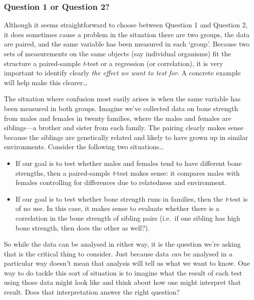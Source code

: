\documentclass[
]{book}
\newenvironment{greybox}{
  \definecolor{shadecolor}{rgb}{0.95,0.95,0.95}  %
  \color{black}
  \begin{shaded}}
 {\end{shaded}}
\newenvironment{infobox}[1]
  {
  \begin{itemize}
  \renewcommand{\labelitemi}{
    \raisebox{-.7\height}[0pt][0pt]{
      {\setkeys{Gin}{width=3em,keepaspectratio}
        \texttt{[image: images/\#1]}}
    }
  }
  \setlength{\fboxsep}{1em}
  \begin{greybox}
  \item
  }
  {
  \end{greybox}
  \end{itemize}
  }
\begin{document}
\begin{infobox}{warning}

\hypertarget{question-1-or-question-2}{%
\subsubsection*{Question 1 or Question 2?}\label{question-1-or-question-2}}

Although it seems straightforward to choose between Question 1 and Question 2, it does sometimes cause a problem in the situation there are two groups, the data are paired, and the same variable has been measured in each `group'. Because two sets of measurements on the same objects (say individual organisms) fit the structure a paired-sample \emph{t}-test or a regression (or correlation), it is very important to identify clearly \emph{the effect we want to test for}. A concrete example will help make this clearer\ldots{}

The situation where confusion most easily arises is when the same variable has been measured in both groups. Imagine we've collected data on bone strength from males and females in twenty families, where the males and females are siblings---a brother and sister from each family. The pairing clearly makes sense because the siblings are genetically related and likely to have grown up in similar environments. Consider the following two situations\ldots{}

\begin{itemize}
\item
  If our goal is to test whether males and females tend to have different bone strengths, then a paired-sample \emph{t}-test makes sense: it compares males with females controlling for differences due to relatedness and environment.
\item
  If our goal is to test whether bone strength runs in families, then the \emph{t}-test is of no use. In this case, it makes sense to evaluate whether there is a correlation in the bone strength of sibling pairs (i.e.~if one sibling has high bone strength, then does the other as well?).
\end{itemize}

So while the data can be analysed in either way, it is the question we're asking that is the critical thing to consider. Just because data \emph{can} be analysed in a particular way doesn't mean that analysis will tell us what we want to know. One way to do tackle this sort of situation is to imagine what the result of each test using those data might look like and think about how one might interpret that result. Does that interpretation answer the right question?

\end{infobox}
\end{document}
